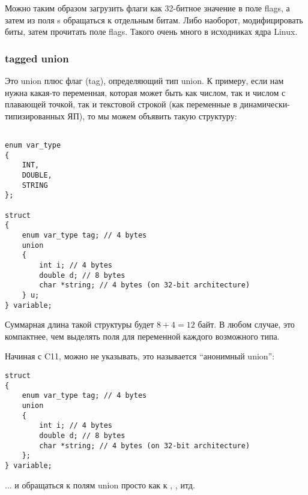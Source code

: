 Можно таким образом загрузить флаги как 32-битное значение в поле flags, а затем из поля s обращаться
к отдельным битам. Либо наоборот, модифицировать биты, затем прочитать поле flags. Такого очень много
в исходниках ядра Linux.

\subsubsection{tagged union}

Это union плюс флаг (tag), определяющий тип union. К примеру, если нам нужна какая-то переменная,
которая может быть как числом, так и числом с плавающей точкой, так и текстовой строкой (как переменные
в динамически-типизированных ЯП), то мы можем объявить такую структуру:

\begin{lstlisting}

enum var_type
{
	INT,
	DOUBLE,
	STRING
};

struct
{
	enum var_type tag; // 4 bytes
	union
	{
		int i; // 4 bytes
		double d; // 8 bytes
		char *string; // 4 bytes (on 32-bit architecture)
	} u;
} variable;
\end{lstlisting}

Суммарная длина такой структуры будет $8+4=12$ байт. В любом случае, это компактнее, чем выделять
поля для переменной каждого возможного типа.

Начиная с C11\cite{C11},  можно не указывать, это называется ``анонимный union'':

\begin{lstlisting}
struct
{
	enum var_type tag; // 4 bytes
	union
	{
		int i; // 4 bytes
		double d; // 8 bytes
		char *string; // 4 bytes (on 32-bit architecture)
	};
} variable;
\end{lstlisting}

... и обращаться к полям union просто как к , , итд.


